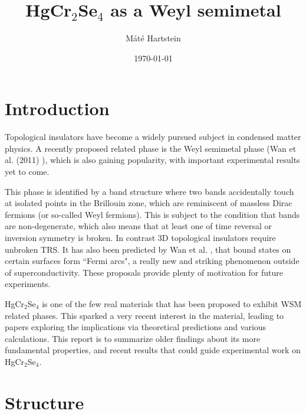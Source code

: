 \documentclass[preprint,pre,floats,aps,amsmath,amssymb]{revtex4}
\begin{document}
\title{HgCr$_2$Se$_4$ as a Weyl semimetal}
\author{M\'{a}t\'{e} Hartstein}
\date{\today}

\clearpage\maketitle
\thispagestyle{empty}


\section{Introduction}
\label{sec:intro}

Topological insulators have become a widely pursued subject in condensed matter physics. A recently proposed related phase is the Weyl semimetal phase (Wan et al. (2011) \cite{wan}), which is also gaining popularity, with important experimental results yet to come.
 
This phase is identified by a band structure where two bands accidentally touch at isolated points in the Brillouin zone, which are reminiscent of massless Dirac fermions (or so-called Weyl fermions). This is subject to the condition that bands are non-degenerate, which also means that at least one of time reversal or inversion symmetry is broken. In contrast 3D topological insulators require unbroken TRS.
It has also been predicted by Wan et al. \cite{wan}, that bound states on certain surfaces form ``{Fermi arcs}", a really new and striking phenomenon outside of superconductivity. These proposals provide plenty of motivation for future experiments.
 
HgCr$_2$Se$_4$ is one of the few real materials that has been proposed to exhibit WSM related phases. This sparked a very recent interest in the material, leading to papers exploring the implications via theoretical predictions and various calculations. This report is to summarize older findings about its more fundamental properties, and recent results that could guide experimental work on HgCr$_2$Se$_4$.



\section{Structure}
\end{document}
